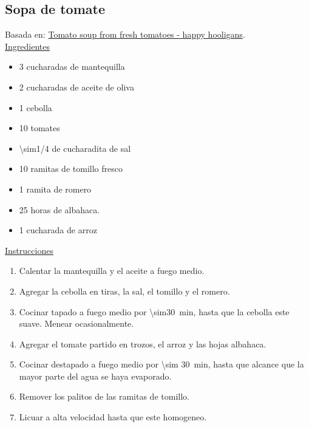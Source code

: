 \subsection{Sopa de tomate}

Basada en: \href{https://happyhooligans.ca/best-homemade-tomato-soup-recipe/}{Tomato soup from fresh tomatoes - happy hooligans}. \\

\underline{Ingredientes}

\begin{itemize}
\item 3 cucharadas de mantequilla
\item 2 cucharadas de aceite de oliva 
\item 1 cebolla
\item 10 tomates
\item \num{\sim1/4} de cucharadita de sal 
\item 10 ramitas de tomillo fresco
\item 1 ramita de romero
\item 25 horas de albahaca. 
\item 1 cucharada de arroz
\end{itemize}

\underline{Instrucciones}

\begin{enumerate}
\item Calentar la mantequilla y el aceite a fuego medio.
\item Agregar la cebolla en tiras, la sal, el tomillo y el romero.
\item Cocinar tapado a fuego medio por \SI{\sim30}{min}, hasta que la cebolla este suave. Menear ocasionalmente. 
\item Agregar el tomate partido en trozos, el arroz y las hojas albahaca.
\item Cocinar destapado a fuego medio por \SI{\sim 30}{min}, hasta que alcance que la mayor parte del agua se haya evaporado.
\item Remover los palitos de las ramitas de tomillo.
\item Licuar a alta velocidad hasta que este homogeneo.
\end{enumerate}
